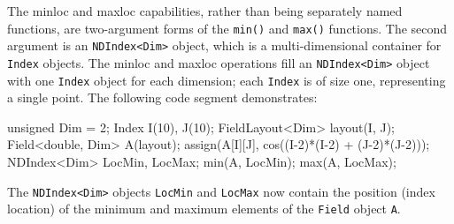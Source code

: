 The minloc and maxloc capabilities, rather than being separately named functions, are two-argument forms of the \texttt{min()} and \texttt{max()} functions. The second argument is an \texttt{NDIndex<Dim>} object, which is a multi-dimensional container for \texttt{Index} objects. The minloc and maxloc operations fill an \texttt{NDIndex<Dim>} object with one \texttt{Index} object for each dimension; each \texttt{Index} is of size one, representing a single point. The following code segment demonstrates: \\
\begin{code}
unsigned Dim = 2;
Index I(10), J(10);
FieldLayout<Dim> layout(I, J);
Field<double, Dim> A(layout);
assign(A[I][J], cos((I-2)*(I-2) + (J-2)*(J-2)));
NDIndex<Dim> LocMin, LocMax;
min(A, LocMin);
max(A, LocMax);
\end{code}
The \texttt{NDIndex<Dim>} objects \texttt{LocMin} and \texttt{LocMax} now contain the position (index location) of the minimum and maximum elements of the \texttt{Field} object \texttt{A}.

